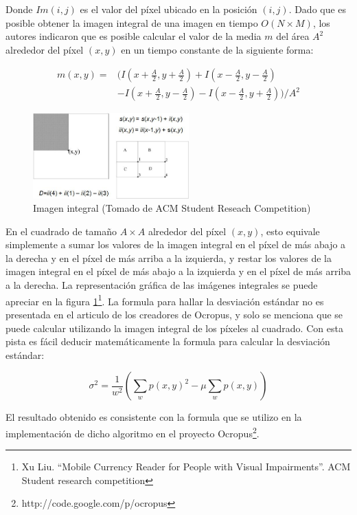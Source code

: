 \documentclass[a4paper, 11pt, oneside]{report}
\begin{document}
Donde $Im(i, j)$ es el valor del píxel ubicado en la posición $(i, j)$. Dado que es posible obtener la imagen integral de una imagen en tiempo $O(N \times M)$, los autores indicaron que es posible calcular el valor de la media $m$ del área $A^{2}$ alrededor del píxel $(x, y)$ en un tiempo constante de la siguiente forma:

\begin{align*}
  m(x, y) =& (I(x + \frac{A}{2}, y + \frac{A}{2}) + I(x - \frac{A}{2}, y - \frac{A}{2}) \\
	   &- I(x + \frac{A}{2}, y - \frac{A}{2}) - I(x - \frac{A}{2}, y + \frac{A}{2})) / A^{2}
\end{align*}

\begin{figure}[htb]
\begin{center}
\leavevmode
\includegraphics[width=6cm]{img/integral.png}
\end{center}
\caption{Imagen integral (Tomado de ACM Student Reseach Competition)}
\label{fig:integral}
\end{figure}

En el cuadrado de tamaño $A \times A$ alrededor del píxel $(x, y)$, esto equivale simplemente a sumar los valores de la imagen integral en el píxel de más abajo a la derecha y en el píxel de más arriba a la izquierda, y restar los valores de la imagen integral en el píxel de más abajo a la izquierda y en el píxel de más arriba a la derecha. La representación gráfica de las imágenes integrales se puede apreciar en la figura \ref{fig:integral}\footnote{Xu Liu. ``Mobile Currency Reader for People with Visual Impairments''. ACM Student research competition}. La formula para hallar la desviación estándar no es presentada en el articulo de los creadores de Ocropus, y solo se menciona que se puede calcular utilizando la imagen integral de los píxeles al cuadrado. Con esta pista es fácil deducir matemáticamente la formula para calcular la desviación estándar:

\[ \sigma^2 = \frac{1}{w^2}\left(\sum_w{p(x,y)^2} - \mu \sum_w{p(x,y)}\right) \]

El resultado obtenido es consistente con la formula que se utilizo en la implementación de dicho algoritmo en el proyecto Ocropus\footnote{http://code.google.com/p/ocropus}.
\end{document}
